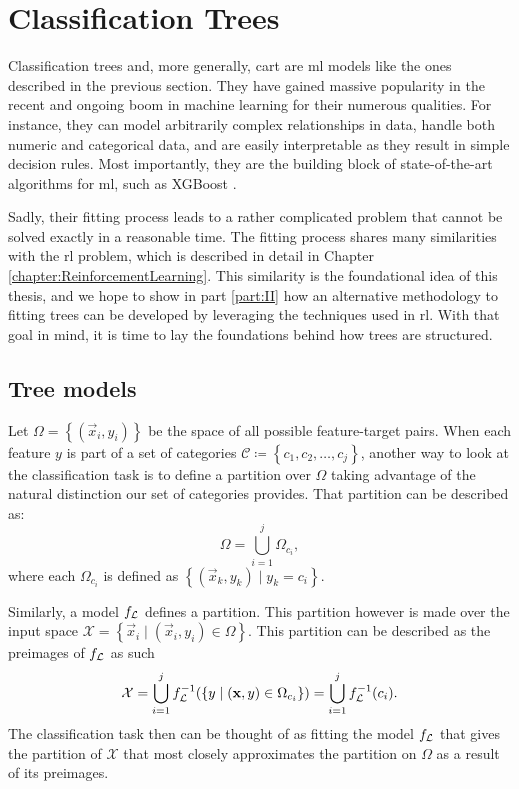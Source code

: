 \section{Classification Trees}

Classification trees and, more generally, \acf{cart} are \ac{ml} models like the
ones described in the previous section.  They have gained massive popularity in
the recent and ongoing boom in machine learning for their numerous qualities.
For instance, they can model arbitrarily complex relationships in data, handle
both numeric and categorical data, and are easily interpretable as they result
in simple decision rules. Most importantly, they are the building block of
state-of-the-art algorithms for \ac{ml}, such as XGBoost \cite{XGBoost}.

Sadly, their fitting process leads to a rather complicated problem that cannot
be solved exactly in a reasonable time. The fitting process shares many
similarities with the \ac{rl} problem, which is described in detail in Chapter
\ref{chapter:ReinforcementLearning}. This similarity is the foundational idea of
this thesis, and we hope to show in part \ref{part:II} how an alternative
methodology to fitting trees can be developed by leveraging the techniques used
in \ac{rl}. With that goal in mind, it is time to lay the foundations behind how
trees are structured.

\subsection{Tree models}

Let $\Omega = \left\{ (\vec{x}_i, y_i) \right\}$ be the space of all possible
feature-target pairs. When each feature $y$ is part of a set of categories
$\mathcal{C} \coloneqq \left\{ c_1, c_2, \dots, c_j \right\}$, another way to
look at the classification task is to define a partition over $\Omega$ taking
advantage of the natural distinction our set of categories provides. That
partition can be described as:
\[
    \Omega = \bigcup_{i=1}^{j} \Omega_{c_i},
\]
where each $\Omega_{c_i}$ is defined as $\left\{ (\vec{x}_k, y_k) \mid y_k = c_i
\right\}$.

Similarly, a model $f_{\mathcal{L}}$ defines a partition. This partition however is made
over the input space $\mathcal{X} = \left\{ \vec{x}_i \mid (\vec{x}_i, y_i) \in
\Omega \right\}$. This partition can be described as the preimages of $f_{\mathcal{L}}$ as
such
\[
    \mathcal{X} = \bigcup_{i=1}^{j} f_{\mathcal{L}}^{-1}(\{ y \mid (\mathbf{x}, y) \in \Omega_{c_i} \}) = \bigcup_{i=1}^{j} f_{\mathcal{L}}^{-1}(c_i).
\]
The classification task then can be thought of as fitting the model $f_{\mathcal{L}}$ that
gives the partition of $\mathcal{X}$ that most closely approximates the
partition on $\Omega$ as a result of its preimages.

